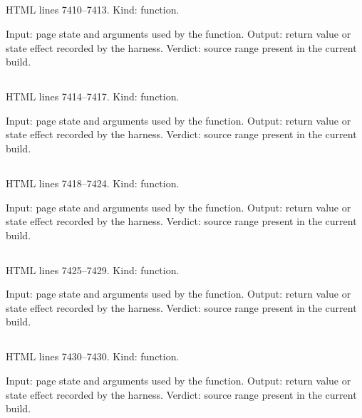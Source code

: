 \subsection*{\texttt{}}
\label{vf_372_mgSetChartType}
HTML lines 7410--7413. Kind: function.

Input: page state and arguments used by the function.
Output: return value or state effect recorded by the harness.
Verdict: source range present in the current build.

\subsection*{\texttt{}}
\label{vf_373_mgSetChartAxis}
HTML lines 7414--7417. Kind: function.

Input: page state and arguments used by the function.
Output: return value or state effect recorded by the harness.
Verdict: source range present in the current build.

\subsection*{\texttt{}}
\label{vf_374_mgReadFiles}
HTML lines 7418--7424. Kind: function.

Input: page state and arguments used by the function.
Output: return value or state effect recorded by the harness.
Verdict: source range present in the current build.

\subsection*{\texttt{}}
\label{vf_375_mgChooseFiles}
HTML lines 7425--7429. Kind: function.

Input: page state and arguments used by the function.
Output: return value or state effect recorded by the harness.
Verdict: source range present in the current build.

\subsection*{\texttt{}}
\label{vf_376_mgLeaveTo}
HTML lines 7430--7430. Kind: function.

Input: page state and arguments used by the function.
Output: return value or state effect recorded by the harness.
Verdict: source range present in the current build.

